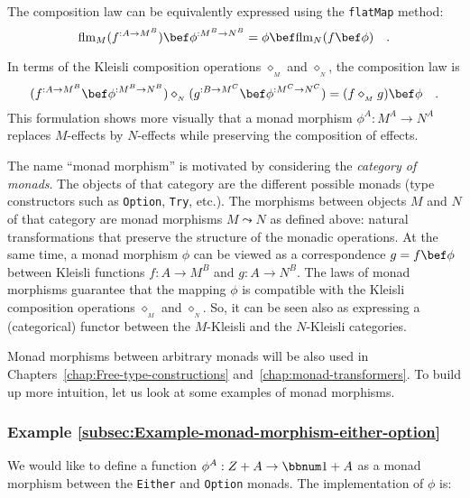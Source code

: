 The composition law can be equivalently expressed using the \lstinline!flatMap!
method:
\begin{equation}
\text{flm}_{M}(f^{:A\rightarrow M^{B}})\bef\phi^{:M^{B}\rightarrow N^{B}}=\phi\bef\text{flm}_{N}(f\bef\phi)\quad.\label{eq:monad-morphism-composition-law-using-flatMap}
\end{equation}

In terms of the Kleisli composition operations $\diamond_{_{M}}$
and $\diamond_{_{N}}$, the composition law is
\[
(f^{:A\rightarrow M^{B}}\bef\phi^{:M^{B}\rightarrow N^{B}})\diamond_{_{N}}(g^{:B\rightarrow M^{C}}\bef\phi^{:M^{C}\rightarrow N^{C}})=(f\diamond_{_{M}}g)\bef\phi\quad.
\]
This formulation shows more visually that a monad morphism $\phi^{A}:M^{A}\rightarrow N^{A}$
replaces $M$-effects by $N$-effects while preserving the composition
of effects.

The name \textsf{``}monad morphism\textsf{''} is motivated by considering the \emph{category
of monads}.
The objects of that category are the different possible monads (type
constructors such as \lstinline!Option!, \lstinline!Try!, etc.).
The morphisms between objects $M$ and $N$ of that category are monad
morphisms $M\leadsto N$ as defined above: natural transformations
that preserve the structure of the monadic operations. At the same
time, a monad morphism $\phi$ can be viewed as a correspondence $g=f\bef\phi$
between Kleisli functions $f:A\rightarrow M^{B}$ and $g:A\rightarrow N^{B}$.
The laws of monad morphisms guarantee that the mapping $\phi$ is
compatible with the Kleisli composition operations $\diamond_{_{M}}$
and $\diamond_{_{N}}$. So, it can be seen also as expressing a (categorical)
functor between the $M$-Kleisli and the $N$-Kleisli categories.

Monad morphisms between arbitrary monads will be also used in Chapters~\ref{chap:Free-type-constructions}
and~\ref{chap:monad-transformers}. To build up more intuition, let
us look at some examples of monad morphisms.

\subsubsection{Example \label{subsec:Example-monad-morphism-either-option}\ref{subsec:Example-monad-morphism-either-option}}

We would like to define a function $\phi^{A}:Z+A\rightarrow\bbnum 1+A$
as a monad morphism between the \lstinline!Either! and \lstinline!Option!
monads. The implementation of $\phi$ is:

